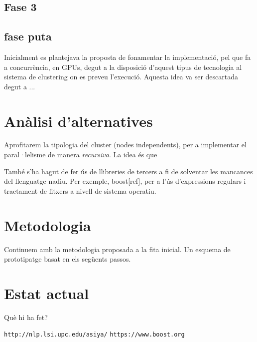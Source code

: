 \documentclass[11pt,a4paper]{article}
\begin{document}
\subsection{Fase 3}
\subsection{fase puta}
Inicialment es plantejava la proposta de fonamentar la implementació, pel que fa a concurrència, en GPUs, degut a la disposició d'aquest tipus de tecnologia al sistema de clustering on es preveu l'execució. Aquesta idea va ser descartada degut a ...

\newpage
\section{Anàlisi d'alternatives}
Aprofitarem la tipologia del cluster (nodes independents), per a implementar el paral·lelisme de manera \textit{recursiva}. La idea és que 

També s'ha hagut de fer ús de llibreries de tercers a fi de solventar les mancances del llenguatge nadiu. Per exemple, boost[ref], per a l'ús d'expressions regulars i tractament de fitxers a nivell de sistema operatiu.

\newpage
\section{Metodologia}
Continuem amb la metodologia proposada a la fita inicial. Un esquema de prototipatge basat en els següents passos.

\newpage
\section{Estat actual}
Què hi ha fet?

\newpage
\begin{thebibliography}{10}
\texttt{http://nlp.lsi.upc.edu/asiya/}
\texttt{https://www.boost.org}

\end{thebibliography}
\end{document}
